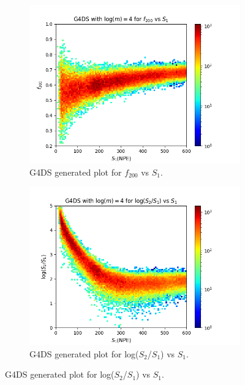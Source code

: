 \documentclass[11pt]{article} %
\begin{document}
\begin{figure}[H]
\centering
\begin{minipage}{\textwidth}
  \begin{subfigure}{.5\textwidth}
      \centering\captionsetup{width=.9\linewidth}%
      \includegraphics[scale=0.6]{./images/4/g4_f200_vs_s1.png}
      \caption{G4DS generated plot for $f_{200}$ vs $S_1$.}
  \end{subfigure}
  \begin{subfigure}{.5\textwidth}
      \centering\captionsetup{width=.9\linewidth}%
      \includegraphics[scale=0.6]{./images/4/g4_s1_over_s2_vs_s1.png}
      \caption{G4DS generated plot for log($S_2$/$S_1$) vs $S_1$.}
  \end{subfigure}

\end{minipage}
\end{figure}
\end{document}
